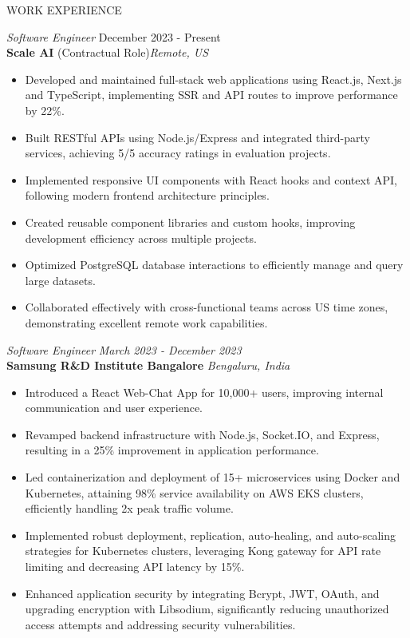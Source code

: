 \documentclass{resume} %
\begin{document}
\begin{rSection}{WORK EXPERIENCE}

\textit{Software Engineer} \hfill December 2023 - Present\\
\textbf{Scale AI} (Contractual Role)\hfill \textit{Remote, US}
 \begin{itemize}
    \vspace{-1pt} %
    \itemsep -3pt {} 
    \item Developed and maintained full-stack web applications using React.js, Next.js and TypeScript, implementing SSR and API routes to improve performance by 22\%.
    \item Built RESTful APIs using Node.js/Express and integrated third-party services, achieving 5/5 accuracy ratings in evaluation projects.
    \item Implemented responsive UI components with React hooks and context API, following modern frontend architecture principles.
    \item Created reusable component libraries and custom hooks, improving development efficiency across multiple projects.

    \item Optimized PostgreSQL database interactions to efficiently manage and query large datasets.
    \item Collaborated effectively with cross-functional teams across US time zones, demonstrating excellent remote work capabilities.
 \end{itemize}

\textit{Software Engineer} \hfill \textit{March 2023 - December 2023} \\
\textbf{Samsung R\&D Institute Bangalore} \hfill \textit{Bengaluru, India}
\begin{itemize}
    \vspace{-1pt}
    \itemsep -3.5pt {}
    \item Introduced a React Web-Chat App for 10,000+ users, improving internal communication and user experience.
    \item Revamped backend infrastructure with Node.js, Socket.IO, and Express, resulting in a 25\% improvement in application performance.
    \item Led containerization and deployment of 15+ microservices using Docker and Kubernetes, attaining 98\% service availability on AWS EKS clusters, efficiently handling 2x peak traffic volume.
    \item Implemented robust deployment, replication, auto-healing, and auto-scaling strategies for Kubernetes clusters, leveraging Kong gateway for API rate limiting and decreasing API latency by 15\%.
    \item Enhanced application security by integrating Bcrypt, JWT, OAuth, and upgrading encryption with Libsodium, significantly reducing unauthorized access attempts and addressing security vulnerabilities.
\end{itemize}



\end{rSection}
\end{document}
